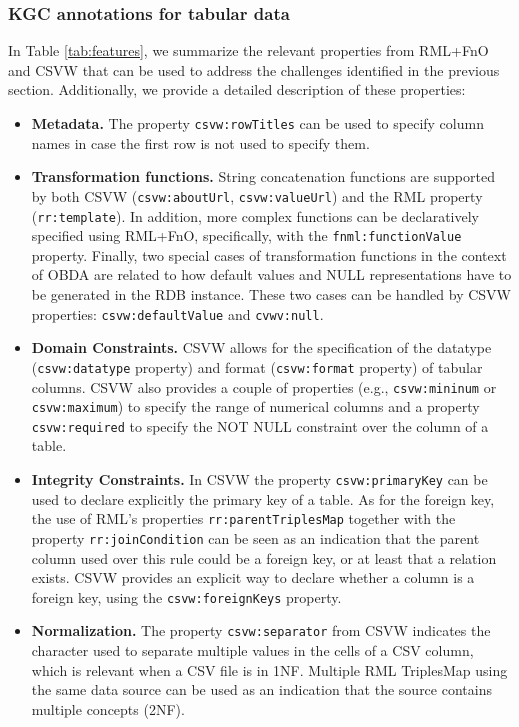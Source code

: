 \subsubsection{KGC annotations for tabular data}
In Table \ref{tab:features}, we summarize the relevant properties from RML+FnO and CSVW that can be used to address the  challenges identified in the previous section. Additionally, we provide a detailed description of these properties:
\begin{itemize}
    \item \textbf{Metadata.} The property \texttt{csvw:rowTitles} can be used to specify column names in case the first row is not used to specify them.
    
    \item \textbf{Transformation functions.} String concatenation functions are supported by both CSVW (\texttt{csvw:aboutUrl}, \texttt{csvw:valueUrl}) and the RML property (\texttt{rr:template}). In addition, more complex functions can be declaratively specified using RML+FnO, specifically, with the \texttt{fnml:functionValue} property. Finally, two special cases of transformation functions in the context of OBDA are related to how default values and NULL representations have to be generated in the RDB instance. These two cases can be handled by CSVW properties: \texttt{csvw:defaultValue} and \texttt{cvwv:null}.
    
    \item \textbf{Domain Constraints.} CSVW allows for the specification of the datatype (\texttt{csvw:datatype} property) and format (\texttt{csvw:format} property) of tabular columns. CSVW also provides a couple of properties (e.g., \texttt{csvw:mininum} or \texttt{csvw:maximum}) to specify the range of numerical columns and a property \texttt{csvw:required} to specify the NOT NULL constraint over the column of a table.
    
    \item \textbf{Integrity Constraints.} In CSVW the property \texttt{csvw:primaryKey} can be used to declare explicitly the primary key of a table. As for the foreign key, the use of RML's properties \texttt{rr:parentTriplesMap} together with the property \texttt{rr:joinCondition} can be seen as an indication that the parent column used over this rule could be a foreign key, or at least that a relation exists. CSVW provides an explicit way to declare whether a column is a foreign key, using the \texttt{csvw:foreignKeys} property. 
    
    \item \textbf{Normalization.} The property \texttt{csvw:separator} from CSVW indicates the character used to separate multiple values in the cells of a CSV column, which is relevant when a CSV file is in 1NF. Multiple RML TriplesMap using the same data source can be used as an indication that the source contains multiple concepts (2NF).
\end{itemize}



